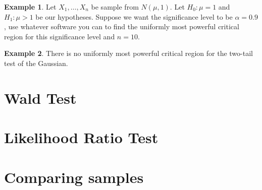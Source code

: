 \documentclass[
  openany]{book}
\theoremstyle{definition}
\theoremstyle{definition}
\newtheorem{example}{Example}[chapter]
\theoremstyle{definition}
\theoremstyle{definition}
\theoremstyle{remark}
\begin{document}
\begin{example}
Let \(X_1, \dots, X_n\) be sample from \(N(\mu, 1)\).
Let \(H_0: \mu = 1\) and \(H_1: \mu >1\) be our hypotheses.
Suppose we want the significance level to be \(\alpha = 0.9\),
use whatever software you can to find the uniformly most
powerful critical region for this significance level and \(n = 10\).
\end{example}

\begin{example}
There is no uniformly most powerful critical region for the two-tail test of the Gaussian.
\end{example}

\hypertarget{wald-test}{%
\section{Wald Test}\label{wald-test}}

\hypertarget{likelihood-ratio-test}{%
\section{Likelihood Ratio Test}\label{likelihood-ratio-test}}

\hypertarget{comparing-samples}{%
\section{Comparing samples}\label{comparing-samples}}
\end{document}
